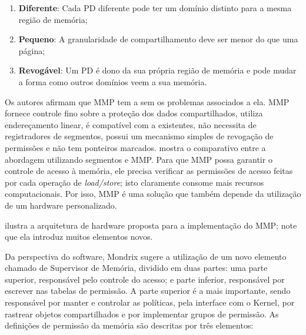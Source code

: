 \begin{enumerate}
	\item \textbf{Diferente}: Cada PD diferente pode ter um domínio distinto
				para a mesma região de memória;
	\item \textbf{Pequeno}: A granularidade de compartilhamento deve ser menor
				do que uma página;
	\item \textbf{Revogável}: Um PD é dono da sua própria região de memória e
				pode mudar a forma como outros domínios veem a sua memória.
\end{enumerate}

Os autores afirmam que MMP tem a  sem os problemas
associados a ela. MMP fornece controle fino sobre a proteção dos dados
compartilhados, utiliza endereçamento linear, é compatível com a 
existentes, não necessita de registradores de segmentos, possui um mecanismo
simples de revogação de permissões e não tem ponteiros marcados. 
mostra o comparativo entre a abordagem utilizando segmentos e MMP. Para que
MMP possa garantir o controle de acesso à memória, ele precisa verificar as
permissões de acesso feitas por cada operação de \emph{load/store}; isto
claramente consome mais recursos computacionais. Por isso, MMP é uma solução
que também depende da utilização de um hardware personalizado.


 ilustra a arquitetura de hardware proposta para a implementação do
MMP; note que ela introduz muitos elementos novos. %

Da perspectiva do software, Mondrix \citep{mondrix} sugere a utilização de um
novo elemento chamado de Supervisor de Memória, dividido em duas partes:
uma parte superior, responsável pelo controle do acesso; e parte inferior, responsável
por escrever nas tabelas de permissão. A parte superior é a mais importante,
sendo responsável por manter e controlar as políticas, pela interface com o Kernel,
por rastrear objetos compartilhados e por implementar grupos de permissão. As
definições de permissão da memória são descritas por três elementos:

